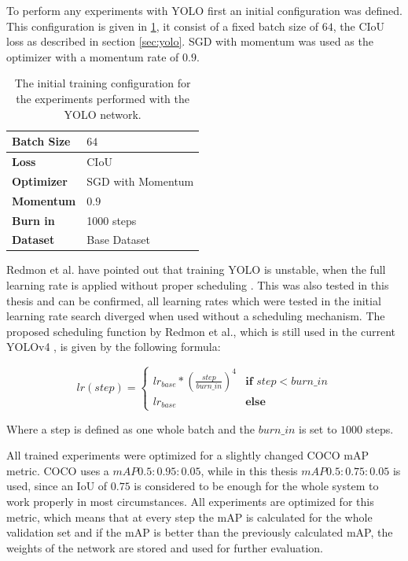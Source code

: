 To perform any experiments with \ac{YOLO} first an initial configuration was defined.
This configuration is given in \ref{tab:initial_yolo_config}, it consist of a fixed batch size of $64$, the \ac{CIoU} loss as described in section \ref{sec:yolo}. \ac{SGD} with momentum was used as the optimizer with a momentum rate of $0.9$.

\begin{table}[H]
\footnotesize
\begin{center}
\begin{tabular}{|l|l|}

\hline
\textbf{Batch Size} & $64$\\
\hline
\textbf{Loss} & CIoU \\
\hline
\textbf{Optimizer} & SGD with Momentum \\
\hline
\textbf{Momentum} & $0.9$ \\
\hline
\textbf{Burn in} & 1000 steps \\
\hline
\textbf{Dataset} & Base Dataset \\
\hline

\end{tabular}
\caption{The initial training configuration for the experiments performed with the YOLO network.}
\label{tab:initial_yolo_config}
\end{center}
\end{table}

Redmon et al. have pointed out that training \ac{YOLO} is unstable, when the full learning rate is applied without proper scheduling \cite{yolov2}.
This was also tested in this thesis and can be confirmed, all learning rates which were tested in the initial learning rate search diverged when used without a scheduling mechanism.
The proposed scheduling function by Redmon et al., which is still used in the current \ac{YOLOv4} \cite{yolov4}, is given by the following formula:

\begin{equation}
    lr(step) =
    \begin{cases}
        lr_{base} * (\frac{step}{burn\_in})^4 & \textbf{if } step < burn\_in\\
        lr_{base}                             & \textbf{else}
    \end{cases}
\end{equation}

Where a step is defined as one whole batch and the $burn\_in$ is set to $1000$ steps.

All trained experiments were optimized for a slightly changed COCO mAP metric.
COCO uses a $mAP0.5:0.95:0.05$, while in this thesis $mAP0.5:0.75:0.05$ is used, since an \ac{IoU} of $0.75$ is considered to be enough for the whole system to work properly in most circumstances.
All experiments are optimized for this metric, which means that at every step the mAP is calculated for the whole validation set and if the mAP is better than the previously calculated mAP, the weights of the network are stored and used for further evaluation.

